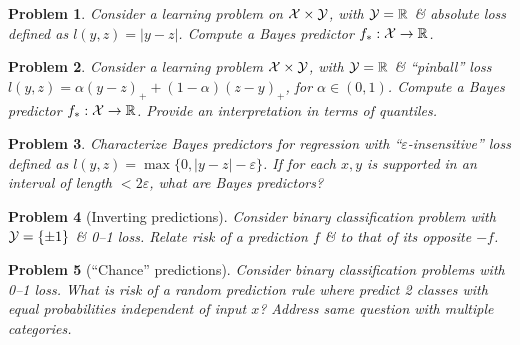 \documentclass{article}
\newtheorem{problem}{Problem}
\begin{document}
\begin{enumerate}
\begin{itemize}
\begin{itemize}
\begin{itemize}
				\begin{problem}
					Consider a learning problem on ${\cal X}\times{\cal Y}$, with ${\cal Y} = \mathbb{R}$ \& absolute loss defined as $l(y,z) = |y - z|$. Compute a Bayes predictor $f_*:{\cal X}\to\mathbb{R}$.
				\end{problem}
				
				\begin{problem}
					Consider a learning problem ${\cal X}\times{\cal Y}$, with ${\cal Y} = \mathbb{R}$ \& ``pinball'' loss $l(y,z) = \alpha(y - z)_+ + (1 - \alpha)(z - y)_+$, for $\alpha\in(0,1)$. Compute a Bayes predictor $f_*:{\cal X}\to\mathbb{R}$. Provide an interpretation in terms of quantiles.
				\end{problem}
				
				\begin{problem}
					Characterize Bayes predictors for regression with ``$\varepsilon$-insensitive'' loss defined as $l(y,z) = \max\{0,|y - z| - \varepsilon\}$. If for each $x,y$ is supported in an interval of length $< 2\varepsilon$, what are Bayes predictors?
				\end{problem}
				
				\begin{problem}[Inverting predictions]
					Consider binary classification problem with ${\cal Y} = \{\pm1\}$ \& 0--1 loss. Relate risk of a prediction $f$ \& to that of its opposite $-f$.
				\end{problem}
				
				\begin{problem}[``Chance'' predictions]
					Consider binary classification problems with 0--1 loss. What is risk of a random prediction rule where predict 2 classes with equal probabilities independent of input $x$? Address same question with multiple categories.
				\end{problem}
				

\end{itemize}
\end{itemize}
\end{itemize}
\end{enumerate}
\end{document}
